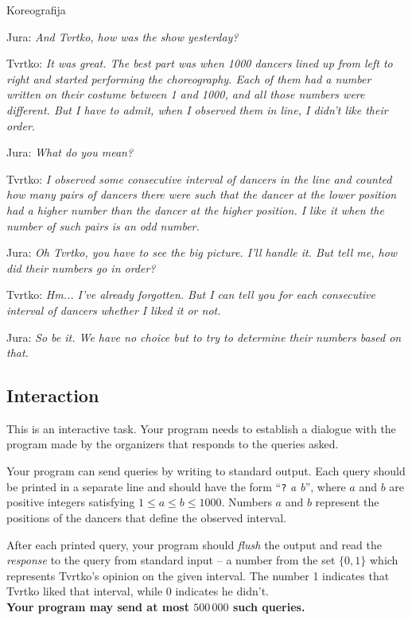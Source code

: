 \begin{statement}[
  problempoints=100,
  timelimit=8 seconds,
  memorylimit=1024 MiB,
]{Koreografija}

Jura: \textit{And Tvrtko, how was the show yesterday?}

Tvrtko: \textit{It was great. The best part was when 1000 dancers lined up
from left to right and started performing the choreography. Each of them had a number
written on their costume between 1 and 1000, and all those numbers were different.
But I have to admit, when I observed them in line, I didn't like their order.}

Jura: \textit{What do you mean?}

Tvrtko: \textit{I observed some consecutive interval of dancers in the line and counted
how many pairs of dancers there were such that the dancer at the lower position had a higher number than the dancer at the higher position.
I like it when the number of such pairs is an odd number.}

Jura: \textit{Oh Tvrtko, you have to see the big picture. I'll handle it. But tell me, how did their numbers go in order?}

Tvrtko: \textit{Hm... I've already forgotten. But I can tell you for each consecutive interval of dancers whether I liked it or not.}

Jura: \textit{So be it. We have no choice but to try to determine their numbers based on that.}

\subsection*{Interaction}
This is an interactive task. Your program needs to establish a dialogue with the program
made by the organizers that responds to the queries asked.

Your program can send queries by writing to standard output. Each query should 
be printed in a separate line and should have the form 
``\texttt{?} \textit{a b}'', where $a$ and $b$  
are positive integers satisfying $1 \leq a \leq b \leq 1000$. Numbers 
$a$ and $b$ represent the positions of the dancers that define the observed interval. 

After each printed query, your program
should \textit{flush} the output and read the 
\textit{response} to the query from standard input -- a number from the set $\{0, 1\}$ which represents 
Tvrtko's opinion on the given interval. 
The number 1 indicates that Tvrtko liked that interval, while 0 indicates he didn't. \\
\textbf{Your program may send at most $500\,000$ such queries.}



\end{statement}
